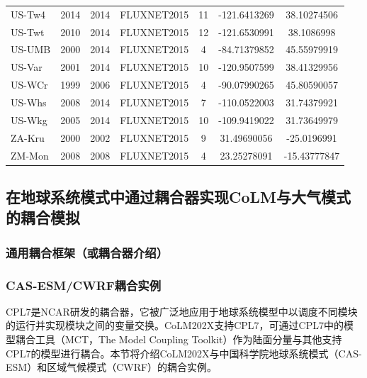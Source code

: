 \begin{center}
\begin{longtable}{lcccccc}
US-Tw4 & 2014 & 2014 & FLUXNET2015 & 11     & -121.6413269 & 38.10274506  \\
US-Twt & 2010 & 2014 & FLUXNET2015 & 12     & -121.6530991 & 38.1086998   \\
US-UMB & 2000 & 2014 & FLUXNET2015 & 4      & -84.71379852 & 45.55979919  \\
US-Var & 2001 & 2014 & FLUXNET2015 & 10     & -120.9507599 & 38.41329956  \\
US-WCr & 1999 & 2006 & FLUXNET2015 & 4      & -90.07990265 & 45.80590057  \\
US-Whs & 2008 & 2014 & FLUXNET2015 & 7      & -110.0522003 & 31.74379921  \\
US-Wkg & 2005 & 2014 & FLUXNET2015 & 10     & -109.9419022 & 31.73649979  \\
ZA-Kru & 2000 & 2002 & FLUXNET2015 & 9      & 31.49690056  & -25.0196991  \\
ZM-Mon & 2008 & 2008 & FLUXNET2015 & 4      & 23.25278091  & -15.43777847 \\ 
\end{longtable}
\end{center}


\subsection{在地球系统模式中通过耦合器实现CoLM与大气模式的耦合模拟}
\subsubsection{通用耦合框架（或耦合器介绍）}
\subsubsection{CAS-ESM/CWRF耦合实例}
CPL7是NCAR研发的耦合器，它被广泛地应用于地球系统模型中以调度不同模块的运行并实现模块之间的变量交换。CoLM202X支持CPL7，可通过CPL7中的模型耦合工具（MCT，The Model Coupling Toolkit）作为陆面分量与其他支持CPL7的模型进行耦合。本节将介绍CoLM202X与中国科学院地球系统模式（CAS-ESM）和区域气候模式（CWRF）的耦合实例。